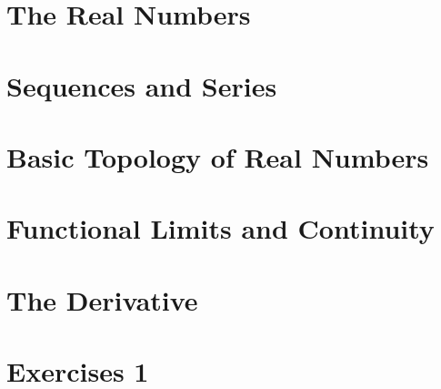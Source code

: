 \documentclass[12pt, oneside]{book}
\renewcommand{\theenumi}{\alph{enumi}}
\renewcommand{\labelenumi}{(\theenumi)}
\begin{document}
\chapter{The Real Numbers}\label{Real nums}
\vspace*{-0.25in}

\setcounter{chapter}{1}

\chapter{Sequences and Series}\label{sequences and series}
\vspace*{-0.25in}

\setcounter{chapter}{2}

\chapter{Basic Topology of Real Numbers}\label{topology}
\vspace*{-0.25in}

\setcounter{chapter}{3}

\chapter{Functional Limits and Continuity}\label{functional limits}
\vspace*{-0.25in}

\setcounter{chapter}{4}


\chapter{The Derivative}\label{Derivative}
\vspace*{-0.25in}


% 


\renewcommand{\theenumi}{\alph{enumi}}
\renewcommand{\labelenumi}{(\theenumi)}
\chapter*{Exercises 1}\label{Exercises 1}
\vspace*{-0.25in}

\end{document}
